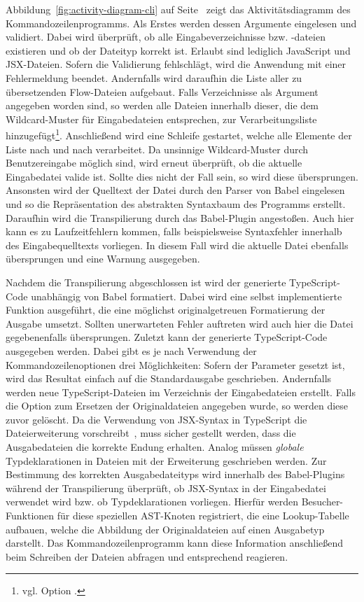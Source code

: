 Abbildung~\ref{fig:activity-diagram-cli} auf Seite~\pageref{fig:activity-diagram-cli} zeigt das Aktivitätsdiagramm des Kommandozeilenprogramms. Als Erstes werden dessen Argumente eingelesen und validiert. Dabei wird überprüft, ob alle Eingabeverzeichnisse bzw. -dateien existieren und ob der Dateityp korrekt ist. Erlaubt sind lediglich JavaScript und JSX-Dateien. Sofern die Validierung fehlschlägt, wird die Anwendung mit einer Fehlermeldung beendet. Andernfalls wird daraufhin die Liste aller zu übersetzenden Flow-Dateien aufgebaut. Falls Verzeichnisse als Argument angegeben worden sind, so werden alle Dateien innerhalb dieser, die dem Wildcard-Muster für Eingabedateien entsprechen, zur Verarbeitungsliste hinzugefügt\footnote{vgl. Option .}. Anschließend wird eine Schleife gestartet, welche alle Elemente der Liste nach und nach verarbeitet. Da unsinnige Wildcard-Muster durch Benutzereingabe möglich sind, wird erneut überprüft, ob die aktuelle Eingabedatei valide ist. Sollte dies nicht der Fall sein, so wird diese übersprungen. Ansonsten wird der Quelltext der Datei durch den Parser von Babel eingelesen und so die Repräsentation des abstrakten Syntaxbaum des Programms erstellt. Daraufhin wird die Transpilierung durch das Babel-Plugin angestoßen. Auch hier kann es zu Laufzeitfehlern kommen, falls beispielsweise Syntaxfehler innerhalb des Eingabequelltexts vorliegen. In diesem Fall wird die aktuelle Datei ebenfalls übersprungen und eine Warnung ausgegeben.

Nachdem die Transpilierung abgeschlossen ist wird der generierte TypeScript-Code unabhängig von Babel formatiert. Dabei wird eine selbst implementierte Funktion ausgeführt, die eine möglichst originalgetreuen Formatierung der Ausgabe umsetzt. Sollten unerwarteten Fehler auftreten wird auch hier die Datei gegebenenfalls übersprungen. Zuletzt kann der generierte TypeScript-Code ausgegeben werden. Dabei gibt es je nach Verwendung der Kommandozeilenoptionen drei Möglichkeiten: Sofern der Parameter  gesetzt ist, wird das Resultat einfach auf die Standardausgabe geschrieben. Andernfalls werden neue TypeScript-Dateien im Verzeichnis der Eingabedateien erstellt. Falls die Option zum Ersetzen der Originaldateien angegeben wurde, so werden diese zuvor gelöscht.
Da die Verwendung von JSX-Syntax in TypeScript die Dateierweiterung  vorschreibt~\autocite{TYPESCRIPT_HANDBOOK:JSX}, muss sicher gestellt werden, dass die Ausgabedateien die korrekte Endung erhalten. Analog müssen \emph{globale} Typdeklarationen in Dateien mit der Erweiterung  geschrieben werden. Zur Bestimmung des korrekten Ausgabedateityps wird innerhalb des Babel-Plugins während der Transpilierung überprüft, ob JSX-Syntax in der Eingabedatei verwendet wird bzw. ob Typdeklarationen vorliegen. Hierfür werden Besucher-Funktionen für diese speziellen AST-Knoten registriert, die eine Lookup-Tabelle aufbauen, welche die Abbildung der Originaldateien auf einen Ausgabetyp darstellt. Das Kommandozeilenprogramm kann diese Information anschließend beim Schreiben der Dateien abfragen und entsprechend reagieren.

